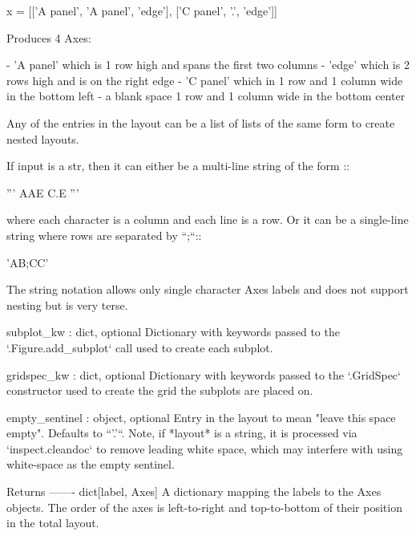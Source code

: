 \begin{DoxyVerb}
\begin{DoxyVerb}
\begin{DoxyVerb}
       x = [['A panel', 'A panel', 'edge'],
    ['C panel', '.',       'edge']]

    Produces 4 Axes:

    - 'A panel' which is 1 row high and spans the first two columns
    - 'edge' which is 2 rows high and is on the right edge
    - 'C panel' which in 1 row and 1 column wide in the bottom left
    - a blank space 1 row and 1 column wide in the bottom center

    Any of the entries in the layout can be a list of lists
    of the same form to create nested layouts.

    If input is a str, then it can either be a multi-line string of
    the form ::

      '''
      AAE
      C.E
      '''

    where each character is a column and each line is a row. Or it
    can be a single-line string where rows are separated by ``;``::

      'AB;CC'

    The string notation allows only single character Axes labels and
    does not support nesting but is very terse.

subplot_kw : dict, optional
    Dictionary with keywords passed to the `.Figure.add_subplot` call
    used to create each subplot.

gridspec_kw : dict, optional
    Dictionary with keywords passed to the `.GridSpec` constructor used
    to create the grid the subplots are placed on.

empty_sentinel : object, optional
    Entry in the layout to mean "leave this space empty".  Defaults
    to ``'.'``. Note, if *layout* is a string, it is processed via
    `inspect.cleandoc` to remove leading white space, which may
    interfere with using white-space as the empty sentinel.

Returns
-------
dict[label, Axes]
   A dictionary mapping the labels to the Axes objects.  The order of
   the axes is left-to-right and top-to-bottom of their position in the
   total layout.\end{DoxyVerb}
 \mbox{\label{classmatplotlib_1_1figure_1_1FigureBase_ac384bad082f13f18a180ca2249e3ce16}} 

\end{DoxyVerb}
\end{DoxyVerb}
